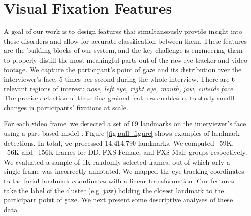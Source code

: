 \documentclass{llncs}
\begin{document}
  \vspace{-2 em}
  \section{Visual Fixation Features}
  \vspace{-1 em}
  \label{sec:feature_extraction}
  A goal of our work is to design features that simultaneously provide insight into these disorders and allow for accurate classification between them. These features are the building blocks of our system, and the key challenge is engineering them to properly distill the most meaningful parts out of the raw eye-tracker and video footage. We capture the participant's point of gaze and its distribution over the interviewer's face, 5 times per second during the whole interview. There are 6 relevant regions of interest: \textit{nose, left eye, right eye, mouth, jaw, outside face}. The precise detection of these fine-grained features enables us to study smalll changes in participants' fixations at scale.

  For each video frame, we detected a set of 69 landmarks on the interviewer's face using a part-based model \cite{dpmface}. Figure \ref{fig:pull_figure} shows examples of landmark detections. In total, we processed 14,414,790 landmarks. %
  We computed ~59K, ~56K and ~156K frames for DD, FXS-Female, and FXS-Male groups respectively. We evaluated a sample of 1K randomly selected frames, out of which only a single frame was incorrectly annotated. We mapped the eye-tracking coordinates to the facial landmark coordinates with a linear transformation. Our features take the label of the cluster (e.g. jaw) holding the closest landmark to the participant point of gaze. We next present some descriptive analyses of these data.

\end{document}
